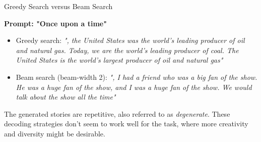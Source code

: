 \documentclass[11pt,compress,t,notes=noshow, xcolor=table]{beamer}
\begin{document}





    


\begin{frame}{Greedy Search versus Beam Search}

\vspace{2ex}
\textbf{Prompt: "Once upon a time"}
\begin{itemize}
\item Greedy search: \textit{", the United States was the world's leading producer of oil and natural gas. Today, we are the world's leading producer of coal. 
The United States is the world's largest producer of oil and natural gas"}
\item Beam search (beam-width 2): \textit{", I had a friend who was a big fan of the show. He was a huge fan of the show, and I was a huge fan of the show. We would talk about the show all the time"}
\end{itemize}
\vspace{2ex}
The generated stories are repetitive, also referred to as \textit{degenerate}. These decoding strategies don't seem to work well for the task, where more creativity and diversity might be desirable.\\
\vspace{2ex}



\end{frame}

\end{document}
